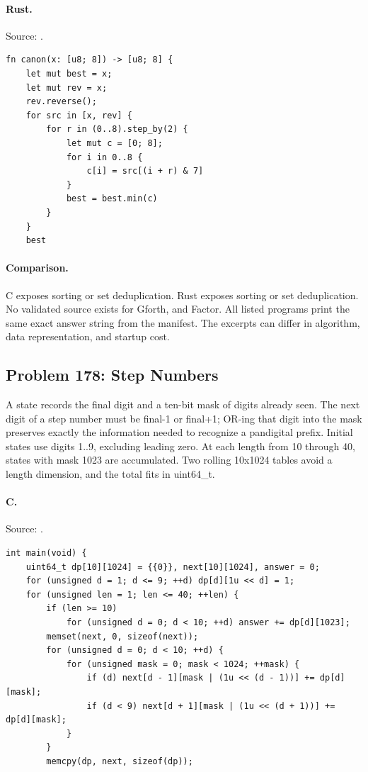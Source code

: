 \paragraph{Rust.} Source: .
\begin{lstlisting}
fn canon(x: [u8; 8]) -> [u8; 8] {
    let mut best = x;
    let mut rev = x;
    rev.reverse();
    for src in [x, rev] {
        for r in (0..8).step_by(2) {
            let mut c = [0; 8];
            for i in 0..8 {
                c[i] = src[(i + r) & 7]
            }
            best = best.min(c)
        }
    }
    best
\end{lstlisting}

\paragraph{Comparison.}
C exposes sorting or set deduplication. Rust exposes sorting or set deduplication.
No validated source exists for Gforth, and Factor.
All listed programs print the same exact answer string from the manifest. The excerpts can differ in algorithm, data representation, and startup cost.

\subsection{Problem 178: Step Numbers}
\label{walkthrough:p178}
A state records the final digit and a ten-bit mask of digits already seen. The next digit of a step number must be final-1 or final+1; OR-ing that digit into the mask preserves exactly the information needed to recognize a pandigital prefix. Initial states use digits 1..9, excluding leading zero. At each length from 10 through 40, states with mask 1023 are accumulated. Two rolling 10x1024 tables avoid a length dimension, and the total fits in uint64\_t.

\paragraph{C.} Source: .
\begin{lstlisting}
int main(void) {
    uint64_t dp[10][1024] = {{0}}, next[10][1024], answer = 0;
    for (unsigned d = 1; d <= 9; ++d) dp[d][1u << d] = 1;
    for (unsigned len = 1; len <= 40; ++len) {
        if (len >= 10)
            for (unsigned d = 0; d < 10; ++d) answer += dp[d][1023];
        memset(next, 0, sizeof(next));
        for (unsigned d = 0; d < 10; ++d) {
            for (unsigned mask = 0; mask < 1024; ++mask) {
                if (d) next[d - 1][mask | (1u << (d - 1))] += dp[d][mask];
                if (d < 9) next[d + 1][mask | (1u << (d + 1))] += dp[d][mask];
            }
        }
        memcpy(dp, next, sizeof(dp));
\end{lstlisting}

